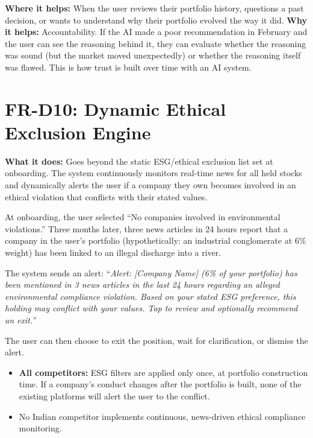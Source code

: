 \documentclass[12pt, a4paper, openany, oneside]{report}
\begin{document}
\begin{valuebox}
\textbf{Where it helps:} When the user reviews their portfolio history, questions a past decision, or wants to understand why their portfolio evolved the way it did. \textbf{Why it helps:} Accountability. If the AI made a poor recommendation in February and the user can see the reasoning behind it, they can evaluate whether the reasoning was sound (but the market moved unexpectedly) or whether the reasoning itself was flawed. This is how trust is built over time with an AI system.
\end{valuebox}

\section{FR-D10: Dynamic Ethical Exclusion Engine}

\textbf{What it does:} Goes beyond the static ESG/ethical exclusion list set at onboarding. The system continuously monitors real-time news for all held stocks and dynamically alerts the user if a company they own becomes involved in an ethical violation that conflicts with their stated values.

\begin{examplebox}
At onboarding, the user selected ``No companies involved in environmental violations.'' Three months later, three news articles in 24 hours report that a company in the user's portfolio (hypothetically: an industrial conglomerate at 6\% weight) has been linked to an illegal discharge into a river.

The system sends an alert: ``\textit{Alert: [Company Name] (6\% of your portfolio) has been mentioned in 3 news articles in the last 24 hours regarding an alleged environmental compliance violation. Based on your stated ESG preference, this holding may conflict with your values. Tap to review and optionally recommend an exit.}''

The user can then choose to exit the position, wait for clarification, or dismiss the alert.
\end{examplebox}

\begin{gapbox}
\begin{itemize}[noitemsep]
  \item \textbf{All competitors:} ESG filters are applied only once, at portfolio construction time. If a company's conduct changes after the portfolio is built, none of the existing platforms will alert the user to the conflict.
  \item No Indian competitor implements continuous, news-driven ethical compliance monitoring.
\end{itemize}
\end{gapbox}
\end{document}
